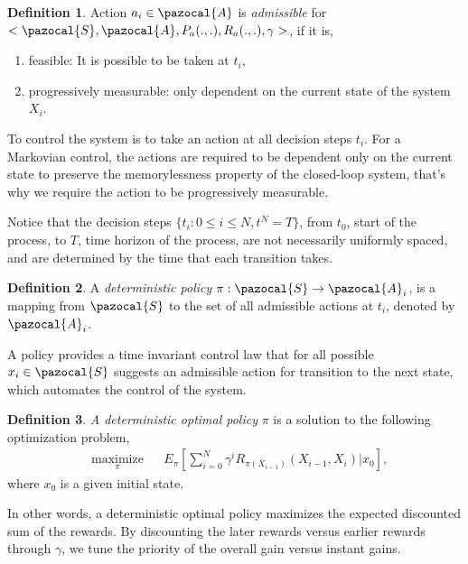 \documentclass[12pt,aas_macros]{article}
\theoremstyle{definition}
\newtheorem{defn}{Definition}
\begin{document}
\begin{defn}
Action $a_{i} \in \pazocal{A}$ is \textit{admissible} for $<\pazocal{S},\pazocal{A}, P_a(.,.), R_a(.,.), \gamma>$, if it is,
\begin{enumerate}
\item feasible: It is possible to be taken at $t_i$,
\item progressively measurable: only dependent on the current state of the system $X_i$.
\end{enumerate}
\end{defn}

To control the system is to take an action at all decision steps $t_i$. For a Markovian control, the actions are required to be dependent only on the current state to preserve the memorylessness property of the closed-loop system, that's why we require the action to be progressively measurable.

Notice that the decision steps $\{ t_i: 0 \leq i \leq N, t^N  =T\}$, from $t_0$, start of the process, to $T$, time horizon of the process, are not necessarily uniformly spaced, and are determined by the time that each transition takes. 

\begin{defn}
A \textit{deterministic policy} $\pi : \pazocal{S} \rightarrow \pazocal{A}_i$, is a mapping from $\pazocal{S}$ to the set of all admissible actions at $t_i$, denoted by $\pazocal{A}_i$. 
\end{defn}

A policy provides a time invariant control law that for all possible $x_i \in \pazocal{S}$ suggests an admissible action for transition to the next state, which automates the control of the system.

\begin{defn}
\textit{A deterministic optimal policy} $\pi$ is a solution to the following optimization problem,
\begin{equation}\label{equ_opt1}
\begin{aligned}
& \underset{\pi}{\text{maximize}}
& & E_{\pi}[\sum_{i = 0}^N \gamma^i R_{\pi(X_{i-1})}(X_{i-1}, X_{i}) | x_0],
\end{aligned}
\end{equation}
where $x_0$ is a given initial state.
\end{defn}

In other words, a deterministic optimal policy maximizes the expected discounted sum of the rewards. By discounting the later rewards versus earlier rewards through $\gamma$, we tune the priority of the overall gain versus instant gains.
\end{document}
